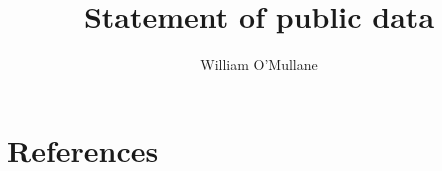 \documentclass[DM,authoryear,toc]{lsstdoc}
\title{Statement of public data}
\author{%
William O'Mullane
}
\date{\vcsDate}
\begin{document}
\mkshorttitle



\appendix
\section{References} \label{sec:bib}


%
\end{document}
